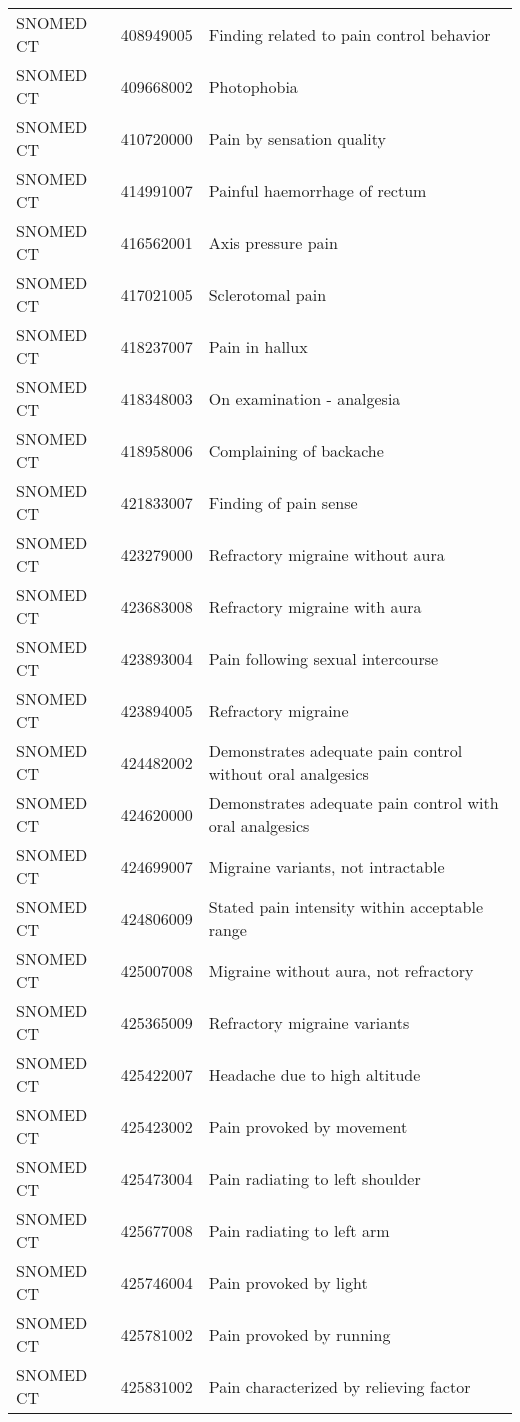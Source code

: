 \begin{longtable}{p{}p{}p{}}
  SNOMED CT & 408949005 & Finding related to pain control behavior \\ 
  SNOMED CT & 409668002 & Photophobia \\ 
  SNOMED CT & 410720000 & Pain by sensation quality \\ 
  SNOMED CT & 414991007 & Painful haemorrhage of rectum \\ 
  SNOMED CT & 416562001 & Axis pressure pain \\ 
  SNOMED CT & 417021005 & Sclerotomal pain \\ 
  SNOMED CT & 418237007 & Pain in hallux \\ 
  SNOMED CT & 418348003 & On examination - analgesia \\ 
  SNOMED CT & 418958006 & Complaining of backache \\ 
  SNOMED CT & 421833007 & Finding of pain sense \\ 
  SNOMED CT & 423279000 & Refractory migraine without aura \\ 
  SNOMED CT & 423683008 & Refractory migraine with aura \\ 
  SNOMED CT & 423893004 & Pain following sexual intercourse \\ 
  SNOMED CT & 423894005 & Refractory migraine \\ 
  SNOMED CT & 424482002 & Demonstrates adequate pain control without oral analgesics \\ 
  SNOMED CT & 424620000 & Demonstrates adequate pain control with oral analgesics \\ 
  SNOMED CT & 424699007 & Migraine variants, not intractable \\ 
  SNOMED CT & 424806009 & Stated pain intensity within acceptable range \\ 
  SNOMED CT & 425007008 & Migraine without aura, not refractory \\ 
  SNOMED CT & 425365009 & Refractory migraine variants \\ 
  SNOMED CT & 425422007 & Headache due to high altitude \\ 
  SNOMED CT & 425423002 & Pain provoked by movement \\ 
  SNOMED CT & 425473004 & Pain radiating to left shoulder \\ 
  SNOMED CT & 425677008 & Pain radiating to left arm \\ 
  SNOMED CT & 425746004 & Pain provoked by light \\ 
  SNOMED CT & 425781002 & Pain provoked by running \\ 
  SNOMED CT & 425831002 & Pain characterized by relieving factor \\ 

\end{longtable}
